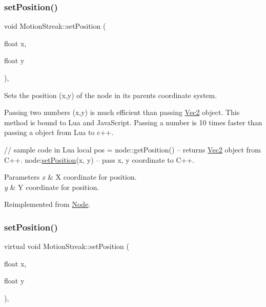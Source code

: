 \subsubsection{\texorpdfstring{set\+Position()}{setPosition()}\hspace{0.1cm}{\footnotesize\ttfamily [3/4]}}
{\footnotesize\ttfamily void Motion\+Streak\+::set\+Position (\begin{DoxyParamCaption}\item[{float}]{x,  }\item[{float}]{y }\end{DoxyParamCaption})\hspace{0.3cm}{\ttfamily [override]}, {\ttfamily [virtual]}}

Sets the position (x,y) of the node in its parent\textquotesingle{}s coordinate system.

Passing two numbers (x,y) is much efficient than passing \hyperlink{classVec2}{Vec2} object. This method is bound to Lua and Java\+Script. Passing a number is 10 times faster than passing a object from Lua to c++.


\begin{DoxyCode}
\textcolor{comment}{// sample code in Lua}
local pos  = node::getPosition()  -- returns \hyperlink{classVec2}{Vec2} \textcolor{keywordtype}{object} from C++.
node:\hyperlink{classMotionStreak_a2d7df706b1ec462093363d18fd0baf58}{setPosition}(x, y)            -- pass x, y coordinate to C++.
\end{DoxyCode}



\begin{DoxyParams}{Parameters}
{\em x} & X coordinate for position. \\
\hline
{\em y} & Y coordinate for position. \\
\hline
\end{DoxyParams}


Reimplemented from \hyperlink{classNode_aaa8545c103ef1b35e5076dbedab93af5}{Node}.

\mbox{\label{classMotionStreak_a5aee78ffa74f687a09d9167b8da6d075}} 
\subsubsection{\texorpdfstring{set\+Position()}{setPosition()}\hspace{0.1cm}{\footnotesize\ttfamily [4/4]}}
{\footnotesize\ttfamily virtual void Motion\+Streak\+::set\+Position (\begin{DoxyParamCaption}\item[{float}]{x,  }\item[{float}]{y }\end{DoxyParamCaption})\hspace{0.3cm}{\ttfamily [override]}, {\ttfamily [virtual]}}

